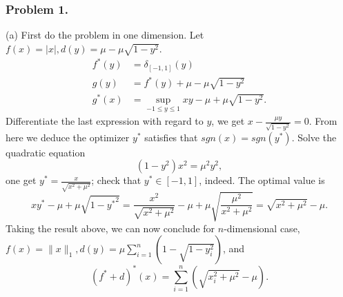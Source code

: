 \documentclass[12pt,a4paper]{article}
\newcommand{\SUM}[2]{\sum\limits_{#1}^{#2}}
\begin{document}
\subsubsection*{Problem 1.}
(a) First do the problem in one dimension. Let $f(x) = |x|, d(y) = \mu-\mu\sqrt{1-y^2}$. 
\begin{align*}
  f^\ast(y) & = \delta_{[-1, 1]}(y) \\
  g(y)      & = f^\ast(y) + \mu - \mu\sqrt{1-y^2} \\
  g^\ast(x) %
            & = \sup_{-1\leq y\leq 1} xy - \mu + \mu \sqrt{1-y^2}.
\end{align*}
Differentiate the last expression with regard to $y$, we get 
$x-\frac{\mu y}{\sqrt{1-y^2}} = 0$. From here we deduce the optimizer $y^\ast$ satisfies that $sgn(x) = sgn(y^\ast)$. Solve the quadratic equation
$$(1-y^2)x^2 = \mu^2y^2,$$
one get $y^\ast = \frac{x}{\sqrt{x^2+\mu^2}}$; check that $y^\ast \in [-1, 1]$, indeed. The optimal value is 
$$xy^\ast - \mu + \mu\sqrt{1-{y^\ast}^2} = \frac{x^2}{\sqrt{x^2+\mu^2}} -\mu + \mu \sqrt{\frac{\mu^2}{x^2+\mu^2}} = \sqrt{x^2+\mu^2}-\mu. $$
Taking the result above, we can now conclude for $n$-dimensional case, $f(x) = \|x\|_1, d(y) = \mu\SUM{i=1}n (1-\sqrt{1-y_i^2})$, and
$$(f^\ast + d)^\ast(x) = \SUM{i=1}n (\sqrt{x_i^2+\mu^2} - \mu).$$
\end{document}
